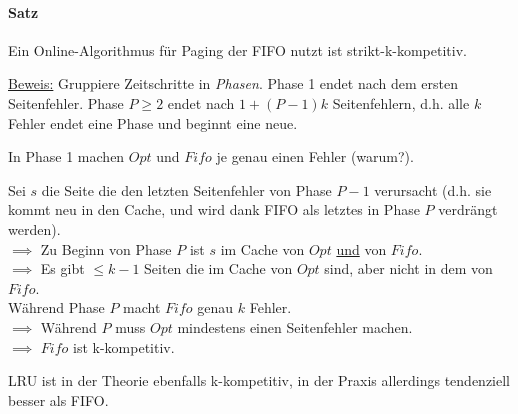 \paragraph{Satz}
Ein Online-Algorithmus für Paging der FIFO nutzt ist strikt-k-kompetitiv.

\underline{Beweis:}
Gruppiere Zeitschritte in \emph{Phasen}.
Phase 1 endet nach dem ersten Seitenfehler.
Phase $P \geq 2$ endet nach $1+ (P-1)k$ Seitenfehlern, d.h. alle $k$ Fehler endet eine Phase und beginnt eine neue.

In Phase 1 machen $Opt$ und $Fifo$ je genau einen Fehler (warum?).

Sei $s$ die Seite die den letzten Seitenfehler von Phase $P-1$ verursacht
(d.h. sie kommt neu in den Cache, und wird dank FIFO als letztes in Phase $P$ verdrängt werden). \\
$\implies$ Zu Beginn von Phase $P$ ist $s$ im Cache von $Opt$ \underline{und} von $Fifo$. \\
$\implies$ Es gibt $\leq k-1$ Seiten die im Cache von $Opt$ sind, aber nicht in dem von $Fifo$. \\
Während Phase $P$ macht $Fifo$ genau $k$ Fehler. \\
$\implies$  Während $P$ muss $Opt$ mindestens einen Seitenfehler machen. \\
$\implies$  $Fifo$ ist k-kompetitiv.

LRU ist in der Theorie ebenfalls k-kompetitiv, in der Praxis allerdings tendenziell besser als FIFO.



